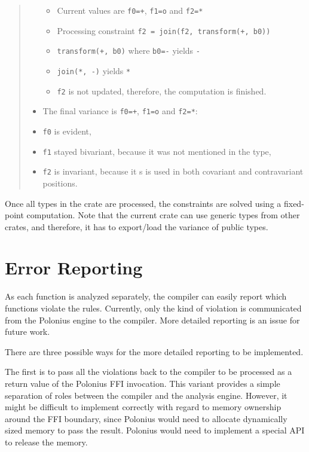 \documentclass[
  11pt,
  twoside,symmetric]{report}
\providecommand{\tightlist}{%
  \setlength{\itemsep}{0pt}\setlength{\parskip}{0pt}}
\begin{document}
\begin{quote}
\begin{itemize}
  \begin{itemize}
  \tightlist
  \item
    Current values are \texttt{f0=+}, \texttt{f1=o} and \texttt{f2=*}
  \item
    Processing constraint \texttt{f2\ =\ join(f2,\ transform(+,\ b0))}
  \item
    \texttt{transform(+,\ b0)} where \texttt{b0=-} yields \texttt{-}
  \item
    \texttt{join(*,\ -)} yields \texttt{*}
  \item
    \texttt{f2} is not updated, therefore, the computation is finished.
  \end{itemize}
\item
  The final variance is \texttt{f0=+}, \texttt{f1=o} and \texttt{f2=*}:
\item
  \texttt{f0} is evident,
\item
  \texttt{f1} stayed bivariant, because it was not mentioned in the
  type,
\item
  \texttt{f2} is invariant, because it s is used in both covariant and
  contravariant positions.
\end{itemize}
\end{quote}

Once all types in the crate are processed, the constraints are solved
using a fixed-point computation. Note that the current crate can use
generic types from other crates, and therefore, it has to export/load
the variance of public types.

\section{Error Reporting}\label{error-reporting}

As each function is analyzed separately, the compiler can easily report
which functions violate the rules. Currently, only the kind of violation
is communicated from the Polonius engine to the compiler. More detailed
reporting is an issue for future work.

There are three possible ways for the more detailed reporting to be
implemented.

The first is to pass all the violations back to the compiler to be
processed as a return value of the Polonius FFI invocation. This variant
provides a simple separation of roles between the compiler and the
analysis engine. However, it might be difficult to implement correctly
with regard to memory ownership around the FFI boundary, since Polonius
would need to allocate dynamically sized memory to pass the result.
Polonius would need to implement a special API to release the memory.
\end{document}

